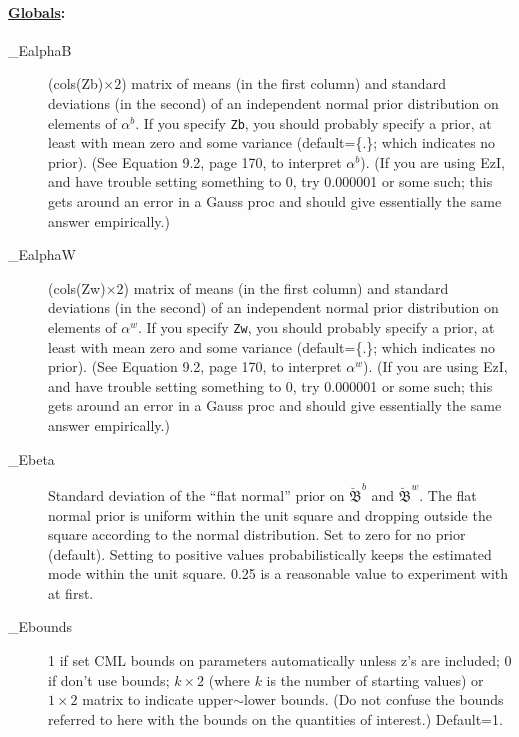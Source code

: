 \documentclass[11pt,titlepage]{article}
\newcommand{\bbetau}{\breve{\mathfrak B}}
\begin{document}
\paragraph{\underline{Globals}:}
\begin{description}
\item[\_EalphaB] (cols(Zb)$\times 2$) matrix of means (in the first
  column) and standard deviations (in the second) of an independent
  normal prior distribution on elements of $\alpha^b$.  If you specify
  \texttt{Zb}, you should probably specify a prior, at least with mean
  zero and some variance (default=\{.\}; which indicates no prior).
  (See Equation 9.2, page 170, to interpret $\alpha^b$). (If you are
  using EzI, and have trouble setting something to 0, try 0.000001 or
  some such; this gets around an error in a Gauss proc and should give
  essentially the same answer empirically.)
  
\item[\_EalphaW] (cols(Zw)$\times 2$) matrix of means (in the first
  column) and standard deviations (in the second) of an independent
  normal prior distribution on elements of $\alpha^w$.  If you specify
  \texttt{Zw}, you should probably specify a prior, at least with mean
  zero and some variance (default=\{.\}; which indicates no prior).
  (See Equation 9.2, page 170, to interpret $\alpha^w$).  (If you are
  using EzI, and have trouble setting something to 0, try 0.000001 or
  some such; this gets around an error in a Gauss proc and should give
  essentially the same answer empirically.)

\item[\_Ebeta] Standard deviation of the ``flat normal'' prior on
  $\bbetau^b$ and $\bbetau^w$.  The flat normal prior is uniform
  within the unit square and dropping outside the square according to
  the normal distribution.  Set to zero for no prior (default).
  Setting to positive values probabilistically keeps the estimated
  mode within the unit square.  0.25 is a reasonable value to
  experiment with at first.

\item[\_Ebounds] 1 if set CML bounds on parameters automatically
  unless z's are included; 0 if don't use bounds; $k\times 2$ (where
  $k$ is the number of starting values) or $1\times 2$ matrix to
  indicate upper$\sim$lower bounds. (Do not confuse the bounds
  referred to here with the bounds on the quantities of interest.)
  Default=1.


\end{description}
\end{document}

